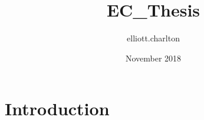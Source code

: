 \documentclass{article}
\title{EC_Thesis}
\author{elliott.charlton }
\date{November 2018}
\begin{document}
\maketitle

\section{Introduction}
\end{document}
